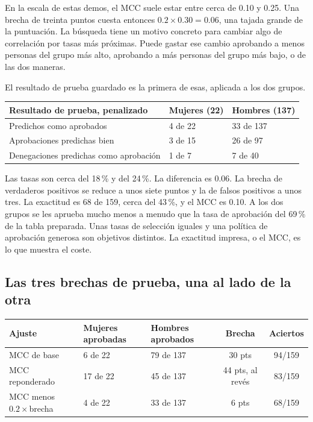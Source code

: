 \documentclass[11pt]{article}
\newcommand{\pct}[1]{\mbox{#1\,\%}}
\begin{document}
En la escala de estas demos, el MCC suele estar entre cerca de 0.10 y 0.25. Una brecha de treinta puntos cuesta entonces \(0.2 \times 0.30 = 0.06\), una tajada grande de la puntuación. La búsqueda tiene un motivo concreto para cambiar algo de correlación por tasas más próximas. Puede gastar ese cambio aprobando a menos personas del grupo más alto, aprobando a más personas del grupo más bajo, o de las dos maneras.

El resultado de prueba guardado es la primera de esas, aplicada a los dos grupos.

\begin{table}[H]
\centering
\small
\begin{tabularx}{\textwidth}{@{}l Y Y@{}}
\toprule
Resultado de prueba, penalizado & Mujeres (22) & Hombres (137) \\
\midrule
Predichos como aprobados & 4 de 22 & 33 de 137 \\
Aprobaciones predichas bien & 3 de 15 & 26 de 97 \\
Denegaciones predichas como aprobación & 1 de 7 & 7 de 40 \\
\bottomrule
\end{tabularx}
\end{table}

Las tasas son cerca del \pct{18} y del \pct{24}. La diferencia es 0.06. La brecha de verdaderos positivos se reduce a unos siete puntos y la de falsos positivos a unos tres. La exactitud es 68 de 159, cerca del \pct{43}, y el MCC es 0.10. A los dos grupos se les aprueba mucho menos a menudo que la tasa de aprobación del \pct{69} de la tabla preparada. Unas tasas de selección iguales y una política de aprobación generosa son objetivos distintos. La exactitud impresa, o el MCC, es lo que muestra el coste.

\subsection{Las tres brechas de prueba, una al lado de la otra}

\begin{table}[H]
\centering
\small
\begin{tabularx}{\textwidth}{@{}l Y Y c c@{}}
\toprule
Ajuste & Mujeres aprobadas & Hombres aprobados & Brecha & Aciertos \\
\midrule
MCC de base & 6 de 22 & 79 de 137 & 30 pts & 94/159 \\
MCC reponderado & 17 de 22 & 45 de 137 & 44 pts, al revés & 83/159 \\
MCC menos \(0.2\times\)brecha & 4 de 22 & 33 de 137 & 6 pts & 68/159 \\
\bottomrule
\end{tabularx}
\end{table}
\end{document}
